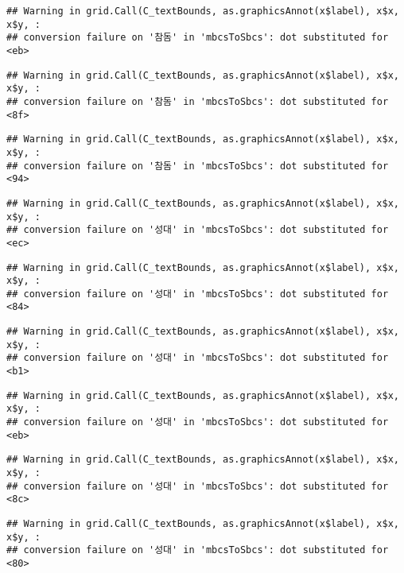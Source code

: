 \documentclass[
]{article}
\begin{document}
\begin{verbatim}
## Warning in grid.Call(C_textBounds, as.graphicsAnnot(x$label), x$x, x$y, :
## conversion failure on '참돔' in 'mbcsToSbcs': dot substituted for <eb>
\end{verbatim}

\begin{verbatim}
## Warning in grid.Call(C_textBounds, as.graphicsAnnot(x$label), x$x, x$y, :
## conversion failure on '참돔' in 'mbcsToSbcs': dot substituted for <8f>
\end{verbatim}

\begin{verbatim}
## Warning in grid.Call(C_textBounds, as.graphicsAnnot(x$label), x$x, x$y, :
## conversion failure on '참돔' in 'mbcsToSbcs': dot substituted for <94>
\end{verbatim}

\begin{verbatim}
## Warning in grid.Call(C_textBounds, as.graphicsAnnot(x$label), x$x, x$y, :
## conversion failure on '성대' in 'mbcsToSbcs': dot substituted for <ec>
\end{verbatim}

\begin{verbatim}
## Warning in grid.Call(C_textBounds, as.graphicsAnnot(x$label), x$x, x$y, :
## conversion failure on '성대' in 'mbcsToSbcs': dot substituted for <84>
\end{verbatim}

\begin{verbatim}
## Warning in grid.Call(C_textBounds, as.graphicsAnnot(x$label), x$x, x$y, :
## conversion failure on '성대' in 'mbcsToSbcs': dot substituted for <b1>
\end{verbatim}

\begin{verbatim}
## Warning in grid.Call(C_textBounds, as.graphicsAnnot(x$label), x$x, x$y, :
## conversion failure on '성대' in 'mbcsToSbcs': dot substituted for <eb>
\end{verbatim}

\begin{verbatim}
## Warning in grid.Call(C_textBounds, as.graphicsAnnot(x$label), x$x, x$y, :
## conversion failure on '성대' in 'mbcsToSbcs': dot substituted for <8c>
\end{verbatim}

\begin{verbatim}
## Warning in grid.Call(C_textBounds, as.graphicsAnnot(x$label), x$x, x$y, :
## conversion failure on '성대' in 'mbcsToSbcs': dot substituted for <80>
\end{verbatim}
\end{document}
